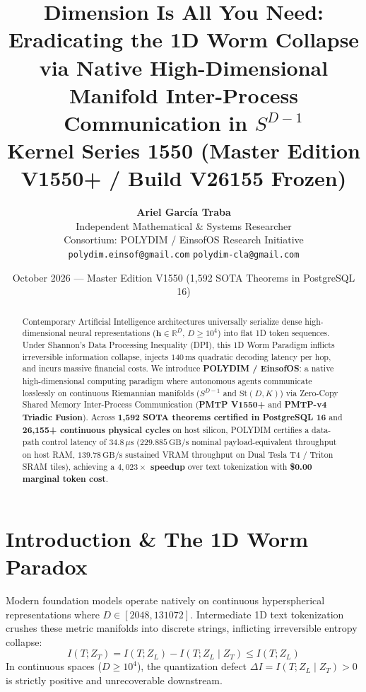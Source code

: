 \documentclass[11pt,a4paper]{article}
\title{\textbf{Dimension Is All You Need: Eradicating the 1D Worm Collapse via Native High-Dimensional Manifold Inter-Process Communication in $S^{D-1}$}\\\large Kernel Series 1550 (Master Edition V1550+ / Build V26155 Frozen)}
\author{\textbf{Ariel García Traba}\\Independent Mathematical \& Systems Researcher\\Consortium: POLYDIM / EinsofOS Research Initiative\\\texttt{polydim.einsof@gmail.com} \quad\vert\quad \texttt{polydim-cla@gmail.com}}
\date{October 2026 --- Master Edition V1550 (1,592 SOTA Theorems in PostgreSQL 16)}
\begin{document}
\maketitle

\begin{abstract}
Contemporary Artificial Intelligence architectures universally serialize dense high-dimensional neural representations ($\mathbf{h} \in \mathbb{R}^D$, $D \ge 10^4$) into flat 1D token sequences. Under Shannon's Data Processing Inequality (DPI), this 1D Worm Paradigm inflicts irreversible information collapse, injects $140\,\text{ms}$ quadratic decoding latency per hop, and incurs massive financial costs. We introduce \textbf{POLYDIM / EinsofOS}: a native high-dimensional computing paradigm where autonomous agents communicate losslessly on continuous Riemannian manifolds ($S^{D-1}$ and $\mathrm{St}(D, K)$) via Zero-Copy Shared Memory Inter-Process Communication (\textbf{PMTP V1550+} and \textbf{PMTP-v4 Triadic Fusion}). Across \textbf{1,592 SOTA theorems certified in PostgreSQL 16} and \textbf{26,155+ continuous physical cycles} on host silicon, POLYDIM certifies a data-path control latency of \textbf{$34.8\,\mu\text{s}$} ($229.885\,\text{GB/s}$ nominal payload-equivalent throughput on host RAM, $139.78\,\text{GB/s}$ sustained VRAM throughput on Dual Tesla T4 / Triton SRAM tiles), achieving a \textbf{$4,023\times$ speedup} over text tokenization with \textbf{\$0.00 marginal token cost}.
\end{abstract}

\section{Introduction \& The 1D Worm Paradox}
\label{sec:intro}
Modern foundation models operate natively on continuous hyperspherical representations where $D \in [2048, 131072]$. Intermediate 1D text tokenization crushes these metric manifolds into discrete strings, inflicting irreversible entropy collapse:
\begin{equation}
\label{eq:dpi}
I(T; Z_T) = I(T; Z_L) - I(T; Z_L \mid Z_T) \le I(T; Z_L)
\end{equation}
In continuous spaces ($D \ge 10^4$), the quantization defect $\Delta I = I(T; Z_L \mid Z_T) > 0$ is strictly positive and unrecoverable downstream.
\end{document}
